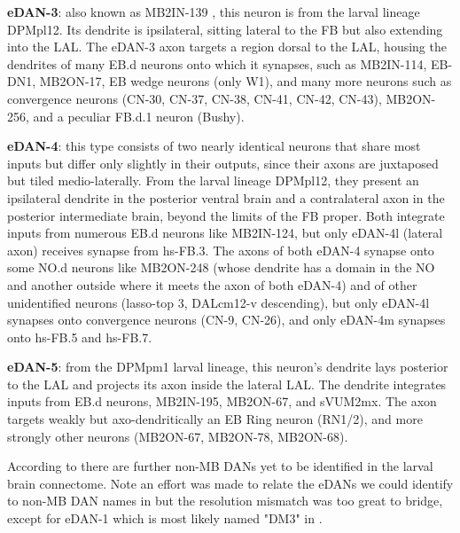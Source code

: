 \textbf{eDAN-3}: also known as MB2IN-139 \citep{eschbach2021circuits}, this neuron is from the larval lineage DPMpl12. Its dendrite is ipsilateral, sitting lateral to the FB but also extending into the LAL. The eDAN-3 axon targets a region dorsal to the LAL, housing the dendrites of  many EB.d neurons onto which it synapses, such as MB2IN-114, EB-DN1, MB2ON-17, EB wedge neurons (only W1), and many more neurons such as convergence neurons (CN-30, CN-37, CN-38, CN-41, CN-42, CN-43), MB2ON-256, and a peculiar FB.d.1 neuron (Bushy).

\textbf{eDAN-4}: this type consists of two nearly identical neurons that share most inputs but differ only slightly in their outputs, since their axons are juxtaposed but tiled medio-laterally. From the larval lineage DPMpl12, they present an ipsilateral dendrite in the posterior ventral brain and a contralateral axon in the posterior intermediate brain, beyond the limits of the FB proper. Both integrate inputs from numerous EB.d neurons like MB2IN-124, but only eDAN-4l (lateral axon) receives synapse from hs-FB.3. The axons of both eDAN-4 synapse onto some NO.d neurons like MB2ON-248 (whose dendrite has a domain in the NO and another outside where it meets the axon of both eDAN-4) and of other unidentified neurons (lasso-top 3, DALcm12-v descending), but only eDAN-4l synapses onto convergence neurons (CN-9, CN-26), and only eDAN-4m synapses onto hs-FB.5 and hs-FB.7.

\textbf{eDAN-5}: from the DPMpm1 larval lineage, this neuron's dendrite lays posterior to the LAL and projects its axon inside the lateral LAL. The dendrite integrates inputs from EB.d neurons, MB2IN-195, MB2ON-67, and sVUM2mx. The axon targets weakly but axo-dendritically an EB Ring neuron (RN1/2), and more strongly other neurons (MB2ON-67, MB2ON-78, MB2ON-68).

According to \citep{selcho2009thgal4} there are further non-MB DANs yet to be identified in the larval brain connectome. Note an effort was made to relate the eDANs we could identify to non-MB DAN names in \citep{selcho2009thgal4} but the resolution mismatch was too great to bridge, except for eDAN-1 which is most likely named "DM3" in \citep{selcho2009thgal4}.




